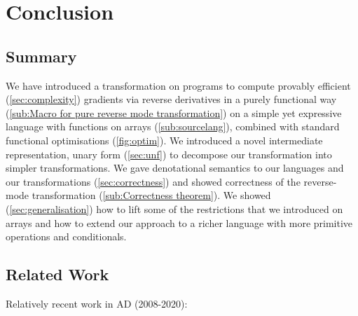 \section{Conclusion}
\label{sec:conclusion}

\subsection{Summary} %
\label{sub:summary}

We have introduced a transformation on programs to compute provably efficient (\ref{sec:complexity}) 
gradients via reverse derivatives in a purely functional way (\ref{sub:Macro for pure reverse mode transformation})
on a simple yet expressive language with functions on arrays (\ref{sub:sourcelang}), 
combined with standard functional optimisations (\ref{fig:optim}).  
We introduced a novel intermediate representation, unary form (\ref{sec:unf}) 
to decompose our transformation into simpler transformations.
We gave denotational semantics to our languages and our transformations (\ref{sec:correctness}) 
and showed correctness of the reverse-mode transformation (\ref{sub:Correctness theorem}).
We showed (\ref{sec:generalisation}) how to lift some of the restrictions that
we introduced on arrays and how to extend our approach to a richer language with more primitive operations and conditionals.

\subsection{Related Work} %
\label{sub:related_work}

Relatively recent work in AD (2008-2020):
\cite{mak2020differential,elliotthigher,vytiniotis2019differentiable,innes2018don,baydin2017automatic,huot2020correctness,gallagher-sdg,manzyuk2012confusion,wang2018demystifying,beck1994if,wang2018backpropagation,betancourt2018geometric,elliott2018simple,carpenter2015stan,paszke2017automatic,shaikhha2019efficient,innes2019zygote,griewank2008evaluating,kucukelbir2017automatic,brunel2019backpropagation,barthe2020versatility,abadi2019simple,cockett2019reverse,van2018automatic,hascoet2013tapenade,abadi2016tensorflow,pearlmutter2008reverse,bergstra2010theano,fong2019backprop,ehrhard2003differential,agrawal2019tensorflow,bettencourt2019taylor,cruttwell2017cartesian,manzyuk2012simply,laue2018computing,bernstein2020differentiating}


